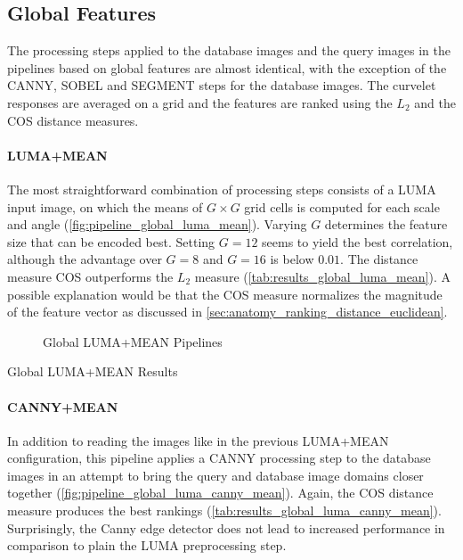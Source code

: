 \subsection{Global Features}

The processing steps applied to the database images and the query images in the
pipelines based on global features are almost identical, with the exception of
the CANNY, SOBEL and SEGMENT steps for the database images. The curvelet
responses are averaged on a grid and the features are ranked using the $L_2$
and the COS distance measures.

\paragraph{LUMA+MEAN}

The most straightforward combination of processing steps consists of a LUMA
input image, on which the means of $G \times G$ grid cells is computed for each
scale and angle (\autoref{fig:pipeline_global_luma_mean}).  Varying $G$
determines the feature size that can be encoded best. Setting $G=12$ seems to
yield the best correlation, although the advantage over $G=8$ and $G=16$ is
below $0.01$. The distance measure COS outperforms the $L_2$ measure
(\autoref{tab:results_global_luma_mean}). A possible explanation would be that
the COS measure normalizes the magnitude of the feature vector as discussed in
\autoref{sec:anatomy_ranking_distance_euclidean}.

\begin{figure}[h]
    \centering
    
    \caption[Global LUMA+MEAN Pipelines]{
        Global LUMA+MEAN Pipelines
    }
    \label{fig:pipeline_global_luma_mean}
\end{figure}

\begin{table}[h]
    \centering
    
    \caption[Global LUMA+MEAN Results]{
        Global LUMA+MEAN Results
    }
    \label{tab:results_global_luma_mean}
\end{table}

\FloatBarrier
\paragraph{CANNY+MEAN}

In addition to reading the images like in the previous LUMA+MEAN configuration,
this pipeline applies a CANNY processing step to the database images in an
attempt to bring the query and database image domains closer together
(\autoref{fig:pipeline_global_luma_canny_mean}). Again, the COS distance
measure produces the best rankings
(\autoref{tab:results_global_luma_canny_mean}).  Surprisingly, the Canny edge
detector does not lead to increased performance in comparison to plain the LUMA
preprocessing step.

